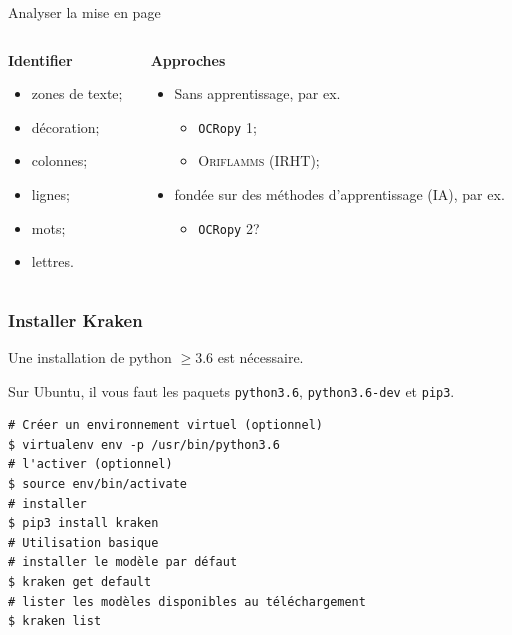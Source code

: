 \documentclass[10pt, compress,urlcolor=blue]{beamer}
\begin{document}
\begin{frame}{Analyser la mise en page}
    \begin{columns}
	\begin{column}{0.45\textwidth}
		\textbf{Identifier}
		\begin{itemize}
		    \item zones de texte;
		    \item décoration;
		    \item colonnes;
		    \item lignes;
		    \item mots;
		    \item lettres.
		\end{itemize}
	\end{column}
	\begin{column}{0.45\textwidth}
		\textbf{Approches}
		\begin{itemize}
		    \item Sans apprentissage, par ex.
		    \begin{itemize}
		        \item \texttt{OCRopy} 1;
		        \item \textsc{Oriflamms} (\textsc{IRHT});
		    \end{itemize}
		    \item fondée sur des méthodes d'apprentissage (IA), par ex.
		    \begin{itemize}
		        \item \texttt{OCRopy} 2?
		    \end{itemize}
 		\end{itemize}
	\end{column}
\end{columns}
    
\end{frame}


\begin{frame}[fragile]
\frametitle{Installer Kraken}

\alert{Une installation de python $\geq 3.6$ est nécessaire.}

Sur Ubuntu, il vous faut les paquets \texttt{python3.6},  \texttt{python3.6-dev} et \texttt{pip3}.

\begin{verbatim}
# Créer un environnement virtuel (optionnel)
$ virtualenv env -p /usr/bin/python3.6
# l'activer (optionnel)
$ source env/bin/activate
# installer
$ pip3 install kraken
# Utilisation basique
# installer le modèle par défaut
$ kraken get default
# lister les modèles disponibles au téléchargement 
$ kraken list
\end{verbatim}
    
\end{frame}
\end{document}
